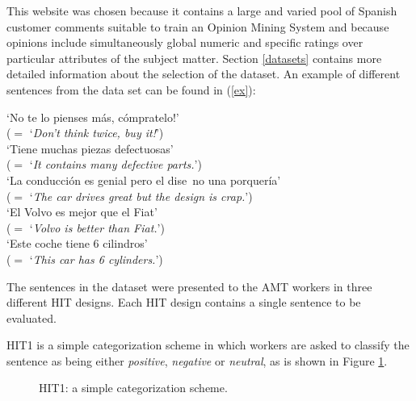 \documentclass[11pt, a4paper,onecolumn]{article}
\begin{document}
This website was chosen because it contains a large and varied pool of Spanish customer comments suitable to train an Opinion Mining System and because opinions include simultaneously global numeric and specific ratings over particular attributes of the subject matter. Section \ref{datasets} contains more detailed information about the selection of the dataset. An example of different sentences from the data set can be found in (\ref{ex}):

\begin{li}
  \label{ex}
  `No te lo pienses m\'{a}s, c\'{o}mpratelo!'\\
  ($=$ `\textit{Don't think twice, buy it!}')\\
   `Tiene muchas piezas defectuosas'\\
  ($=$ `\textit{It contains many defective parts.}')\\ 	
   `La conducci\'on es genial pero el dise~no una porquer\'ia'\\
  ($=$ `\textit{The car drives great but the design is crap.}')\\ 
   `El Volvo es mejor que el Fiat'\\
  ($=$ `\textit{Volvo is better than Fiat.}')\\ 
 `Este coche tiene 6 cilindros'\\
  ($=$ `\textit{This car has 6 cylinders.}')\\ 		
\end{li}


The sentences in the dataset were presented to the AMT workers in three different HIT designs. Each HIT design contains a single sentence to be evaluated. 

HIT1 is a simple categorization scheme in which workers are asked to classify the sentence as being either \textit{positive}, \textit{negative} or \textit{neutral}, as is shown in Figure \ref{hit1}. 


\begin{figure}[ht]
  \begin{center}
	\caption{HIT1: a simple categorization scheme.}
	\label{hit1}
  \end{center}
\end{figure}
\end{document}
